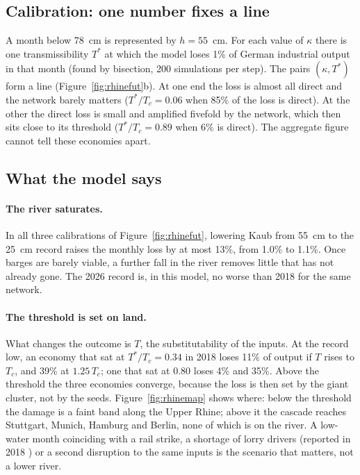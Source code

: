 \documentclass[11pt,a4paper]{article}
\theoremstyle{definition}
\theoremstyle{remark}
\begin{document}
\subsection{Calibration: one number fixes a line}

A month below 78~cm is represented by $h = 55$~cm. For each value of $\kappa$ there is one transmissibility $T^*$ at which the model loses 1\% of German industrial output in that month (found by bisection, 200 simulations per step). The pairs $(\kappa, T^*)$ form a line (Figure~\ref{fig:rhinefut}b). At one end the loss is almost all direct and the network barely matters ($T^*/T_c = 0.06$ when 85\% of the loss is direct). At the other the direct loss is small and amplified fivefold by the network, which then sits close to its threshold ($T^*/T_c = 0.89$ when 6\% is direct). The aggregate figure cannot tell these economies apart.

\subsection{What the model says}

\paragraph{The river saturates.} In all three calibrations of Figure~\ref{fig:rhinefut}, lowering Kaub from 55~cm to the 25~cm record raises the monthly loss by at most 13\%, from 1.0\% to 1.1\%. Once barges are barely viable, a further fall in the river removes little that has not already gone. The 2026 record is, in this model, no worse than 2018 for the same network.

\paragraph{The threshold is set on land.} What changes the outcome is $T$, the substitutability of the inputs. At the record low, an economy that sat at $T^*/T_c = 0.34$ in 2018 loses 11\% of output if $T$ rises to $T_c$, and 39\% at $1.25\,T_c$; one that sat at $0.80$ loses 4\% and 35\%. Above the threshold the three economies converge, because the loss is then set by the giant cluster, not by the seeds. Figure~\ref{fig:rhinemap} shows where: below the threshold the damage is a faint band along the Upper Rhine; above it the cascade reaches Stuttgart, Munich, Hamburg and Berlin, none of which is on the river. A low-water month coinciding with a rail strike, a shortage of lorry drivers (reported in 2018 \citep{ICIS2018}) or a second disruption to the same inputs is the scenario that matters, not a lower river.
\end{document}

